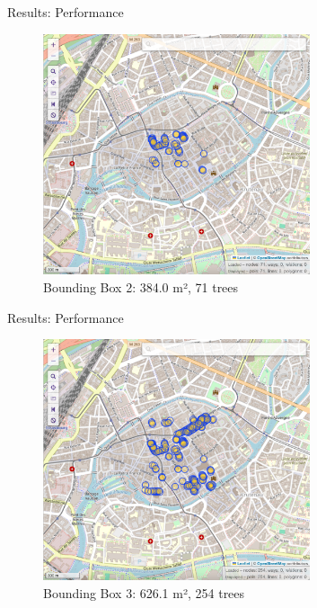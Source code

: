 \documentclass[10pt]{beamer}
\begin{document}
  \begin{frame}{Results: Performance}
	\Large
	\begin{figure}[H]
	  \centering
	  \includegraphics[width=0.7\textwidth]{images/ovt-bbox2.png}
	  \caption{Bounding Box 2: 384.0 m², 71 trees}
  \end{figure}
  \end{frame}

  \begin{frame}{Results: Performance}
	\Large
	\begin{figure}[H]
	  \centering
	  \includegraphics[width=0.7\textwidth]{images/ovt-bbox3.png}
	  \caption{Bounding Box 3: 626.1 m², 254 trees}
  \end{figure}
  \end{frame}
\end{document}
